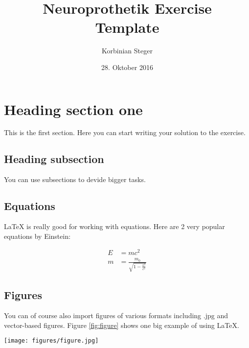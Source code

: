 \documentclass{scrartcl}			%
\title{Neuroprothetik Exercise \\ Template}
\author{Korbinian Steger}
\date{28. Oktober 2016}
\begin{document}

\maketitle

\section{Heading section one}		%

This is the first section. Here you can start writing your solution to the exercise.

\subsection{Heading subsection}		%

You can use subsections to devide bigger tasks.

\subsection{Equations}

\LaTeX{} is really good for working with equations. Here are 2 very popular equations by Einstein:

\begin{align}						%
E &= mc^2                                  \\%
m &= \frac{m_0}{\sqrt{1-\frac{v^2}{c^2}}}
\end{align}

\subsection{Figures}
\label{subsec_fig} %

You can of course also import figures of various formats including .jpg and vector-based figures. Figure \ref{fig:figure} shows one big example of using \LaTeX{}.

\begin{figure*}[hbpt!]					%
	\centering
	\texttt{[image: figures/figure.jpg]}
	\captionsetup{width=\linewidth}  %
	\caption{Here goes the caption for the figure.}
	\label{fig:figure} %
\end{figure*}
\end{document}
